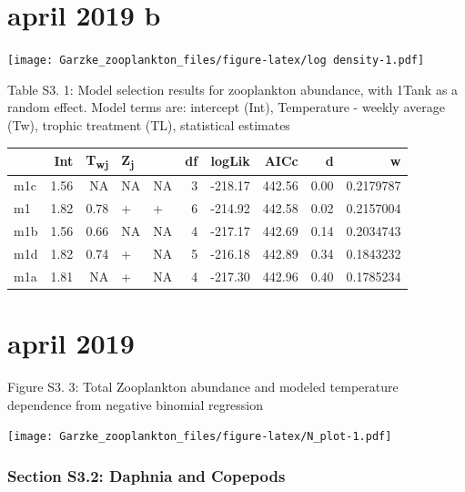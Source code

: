 \documentclass[]{article}
\let\oldparagraph\paragraph
\renewcommand{\paragraph}[1]{\oldparagraph{#1}\mbox{}}
\begin{document}
\section{april 2019 b}\label{april-2019-b}

\texttt{[image: Garzke\_zooplankton\_files/figure-latex/log density-1.pdf]}

Table S3. 1: Model selection results for zooplankton abundance, with
1\textbar{}Tank as a random effect. Model terms are: intercept (Int),
Temperature - weekly average (Tw), trophic treatment (TL), statistical
estimates

\begin{longtable}[]{@{}lrrllrrrrr@{}}
\toprule
& Int & T\textsubscript{wj} & Z\textsubscript{j} & & df & logLik & AICc
& d & w\tabularnewline
\midrule
\endhead
m1c & 1.56 & NA & NA & NA & 3 & -218.17 & 442.56 & 0.00 &
0.2179787\tabularnewline
m1 & 1.82 & 0.78 & + & + & 6 & -214.92 & 442.58 & 0.02 &
0.2157004\tabularnewline
m1b & 1.56 & 0.66 & NA & NA & 4 & -217.17 & 442.69 & 0.14 &
0.2034743\tabularnewline
m1d & 1.82 & 0.74 & + & NA & 5 & -216.18 & 442.89 & 0.34 &
0.1843232\tabularnewline
m1a & 1.81 & NA & + & NA & 4 & -217.30 & 442.96 & 0.40 &
0.1785234\tabularnewline
\bottomrule
\end{longtable}

\section{april 2019}\label{april-2019}

Figure S3. 3: Total Zooplankton abundance and modeled temperature
dependence from negative binomial regression

\texttt{[image: Garzke\_zooplankton\_files/figure-latex/N\_plot-1.pdf]}

\paragraph{}\label{section}

\paragraph{}\label{section-1}

\paragraph{}\label{section-2}

\subsubsection{Section S3.2: Daphnia and
Copepods}\label{section-s3.2-daphnia-and-copepods}
\end{document}
